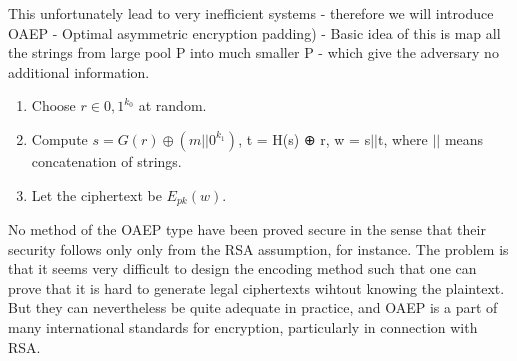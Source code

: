 \documentclass[a4paper,10pt]{article}
\begin{document}
This unfortunately lead to very inefficient  systems - therefore we will introduce OAEP - Optimal asymmetric encryption padding) - Basic idea of this is map all the strings from large pool P into much smaller P - which give the adversary no additional information.
\begin{enumerate}
\item Choose $r \in {0,1}^{k_0}$ at random.
\item Compute $s = G(r) ⊕ (m||0^{k_1})$, t = H(s) ⊕ r, w = s$||$t, where $||$ means concatenation of strings.
\item  Let the ciphertext be $E_{pk}(w)$.
\end{enumerate}
No method of the OAEP type have been proved secure in the sense that their security follows
only only from the RSA assumption, for instance. The problem is that it seems very difficult to
design the encoding method such that one can prove that it is hard to generate legal ciphertexts
wihtout knowing the plaintext. But they can nevertheless be quite adequate in practice, and OAEP is a part of many international standards for encryption, particularly in connection with RSA.
\end{document}
